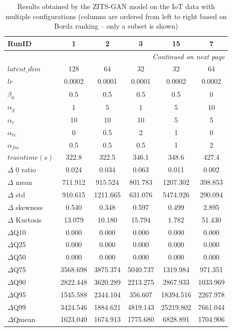 \documentclass[make,article,submit,moreauthors]{Definitions/mdpi}
\begin{document}
\begin{longtable}{l ccccc}
\caption{Results obtained by the ZITS-GAN model on the IoT data with multiple configurations
(columns are ordered from left to right based on Borda ranking -- only a subset is shown)}
\label{tab:hyperparams_iot_gan}\\

\toprule
\textbf{RunID} & \textbf{1} & \textbf{2} & \textbf{3} & \textbf{15} & \textbf{7} \\
\midrule
\endhead

\midrule
\multicolumn{6}{r}{\textit{Continued on next page}}\\
\endfoot

\bottomrule
\endlastfoot

$\mathit{latent\_dim}$   & 128    & 64     & 32     & 32     & 64     \\
$\mathit{lr}$            & 0.0002 & 0.0001 & 0.0001 & 0.0002 & 0.0002 \\
$\beta_0$      & 0.5    & 0.5    & 0.5    & 0.5    & 0      \\
$\alpha_{g}$  & 1      & 5      & 1      & 5      & 10     \\
$\alpha_{r}$  & 10     & 10     & 10     & 5      & 5      \\
$\alpha_{tc}$     & 0      & 0.5    & 2      & 1      & 0      \\
$\alpha_{fm}$     & 0.5    & 0.5    & 0.5    & 1      & 2      \\
$\mathit{train time (s)}$    & 322.8  & 322.5  & 346.1  & 348.6  & 427.4  \\

\midrule

$\Delta$ 0 ratio        & 0.024  & 0.034  & 0.063  & 0.011  & 0.002  \\
$\Delta$ mean            & 711.912 & 915.524 & 801.783 & 1207.302 & 398.853 \\
$\Delta$ std             & 910.615 & 1211.665 & 631.076 & 5474.926 & 290.094 \\
$\Delta$ skewness        & 0.540 & 0.348 & 0.597 & 0.499 & 2.895 \\
$\Delta$ Kurtosis        & 13.079 & 10.180 & 15.794 & 1.782 & 51.430 \\
$\Delta$Q10              & 0.000 & 0.000 & 0.000 & 0.000 & 0.000 \\
$\Delta$Q25              & 0.000 & 0.000 & 0.000 & 0.000 & 0.000 \\
$\Delta$Q50              & 0.000 & 0.000 & 0.000 & 0.000 & 0.000 \\
$\Delta$Q75              & 3568.698 & 3875.374 & 5040.737 & 1319.984 & 971.351 \\
$\Delta$Q90              & 2822.448 & 3620.289 & 2213.275 & 2867.933 & 1033.969 \\
$\Delta$Q95              & 1545.588 & 2344.104 & 356.607 & 18394.516 & 2267.978 \\
$\Delta$Q99              & 3424.546 & 1884.621 & 4819.143 & 25219.802 & 7661.044 \\
$\Delta$Qmean            & 1623.040 & 1674.913 & 1775.680 & 6828.891 & 1704.906 \\


\end{longtable}
\end{document}

